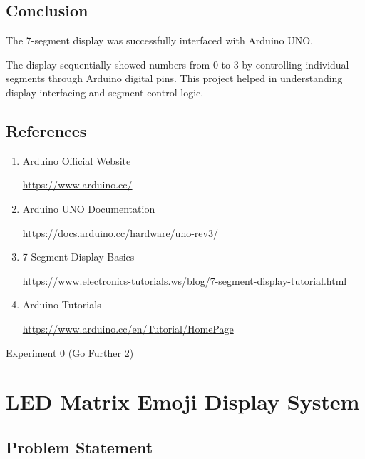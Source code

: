 
\subsection{Conclusion}

The 7-segment display was successfully interfaced with Arduino UNO.

The display sequentially showed numbers from 0 to 3 by controlling individual segments through Arduino digital pins. This project helped in understanding display interfacing and segment control logic.


\subsection{References}

\begin{enumerate}

\item Arduino Official Website

\url{https://www.arduino.cc/}

\item Arduino UNO Documentation

\url{https://docs.arduino.cc/hardware/uno-rev3/}

\item 7-Segment Display Basics

\url{https://www.electronics-tutorials.ws/blog/7-segment-display-tutorial.html}

\item Arduino Tutorials

\url{https://www.arduino.cc/en/Tutorial/HomePage}
\end{enumerate}


\clearpage
Experiment 0 (Go Further 2)

\section{LED Matrix Emoji Display System}



\subsection{Problem Statement}

